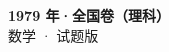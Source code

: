\documentclass[zihao=-4, a4paper]{ctexart}
\begin{document}
\begin{center}
  {\Large\bfseries 1979 年·全国卷（理科）}\\[4pt]
  {\large 数学 · 试题版}
\end{center}
\medskip
{}

\end{document}
